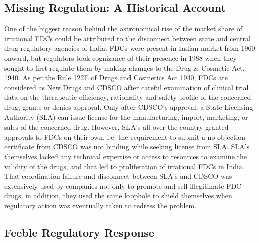 \documentclass[AER]{AEA}
\theoremstyle{theorem}
\begin{document}
\subsection*{Missing Regulation: A Historical Account}

One of the biggest reason behind the astronomical rise of the market share of  irrational FDCs could be attributed to the disconnect between state and central drug regulatory agencies of India. FDCs were present in Indian market from 1960 onward, but regulators took cognizance of their presence in 1988 when they sought to first regulate them by making changes to the Drug \& Cosmetic Act, 1940. As per the  Rule 122E of Drugs and Cosmetics Act 1940, FDCs are considered as New Drugs and CDSCO after careful examination of clinical trial data on the therapeutic efficiency, rationality and safety profile of the concerned drug,  grants or denies approval. Only after CDSCO's approval, a State Licensing Authority (SLA) can issue license for the manufacturing, import, marketing, or sales of the concerned drug. However, SLA's all over the country  granted approvals to FDCs on their own, i.e. the requirement to submit a no-objection certificate from CDSCO was not binding while seeking license from SLA. SLA's themselves lacked any technical expertise or access to resources to examine the validity of the  drugs, and that led to proliferation of irrational FDCs in India.
That coordination-failure and disconnect between SLA's and CDSCO was extensively used by companies not only to promote and sell illegitimate FDC drugs, in addition, they used the same loophole to shield themselves when regulatory action was eventually taken to redress the problem.

\subsection*{Feeble Regulatory Response}
\end{document}
